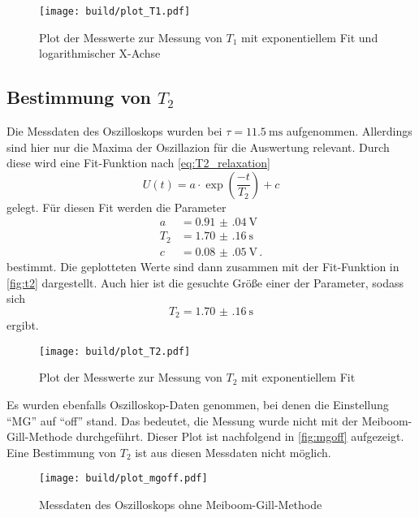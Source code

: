 \begin{figure}
    \centering
    \texttt{[image: build/plot\_T1.pdf]}
    \caption{Plot der Messwerte zur Messung von $T_1$ mit exponentiellem Fit und logarithmischer X-Achse}
    \label{fig:t1}
\end{figure}

\subsection{Bestimmung von \texorpdfstring{$T_2$}{T2}}
\label{ssec:aus2}

Die Messdaten des Oszilloskops wurden bei $\tau = \SI{11.5}{\milli\second}$ aufgenommen.
Allerdings sind hier nur die Maxima der Oszillazion für die Auswertung relevant.
Durch diese wird eine Fit-Funktion nach \autoref{eq:T2_relaxation}
\begin{equation}
    U(t) = a \cdot \exp(\frac{- t}{T_2}) + c 
    \label{eq:fit_t2}
\end{equation}
gelegt.
Für diesen Fit werden die Parameter 
\begin{align*}
    a &= \SI{0.91(04)}{\volt} \\
    T_2 &= \SI{1.70(16)}{\second} \\
    c &= \SI{0.08(05)}{\volt} \, .
\end{align*}
bestimmt.
Die geplotteten Werte sind dann zusammen mit der Fit-Funktion in \autoref{fig:t2} dargestellt.
Auch hier ist die gesuchte Größe einer der Parameter, sodass sich 
\begin{equation}
    T_2 = \SI{1.70(16)}{\second} 
    \label{eq:t2_wert}
\end{equation}
ergibt.
\begin{figure}
    \centering
    \texttt{[image: build/plot\_T2.pdf]}
    \caption{Plot der Messwerte zur Messung von $T_2$ mit exponentiellem Fit}
    \label{fig:t2}
\end{figure}

Es wurden ebenfalls Oszilloskop-Daten genommen, bei denen die Einstellung \enquote{MG} auf \enquote{off} stand.
Das bedeutet, die Messung wurde nicht mit der Meiboom-Gill-Methode durchgeführt.
Dieser Plot ist nachfolgend in \autoref{fig:mgoff} aufgezeigt.
Eine Bestimmung von $T_2$ ist aus diesen Messdaten nicht möglich.

\begin{figure}
    \centering
    \texttt{[image: build/plot\_mgoff.pdf]}
    \caption{Messdaten des Oszilloskops ohne Meiboom-Gill-Methode}
    \label{fig:mgoff}
\end{figure}

